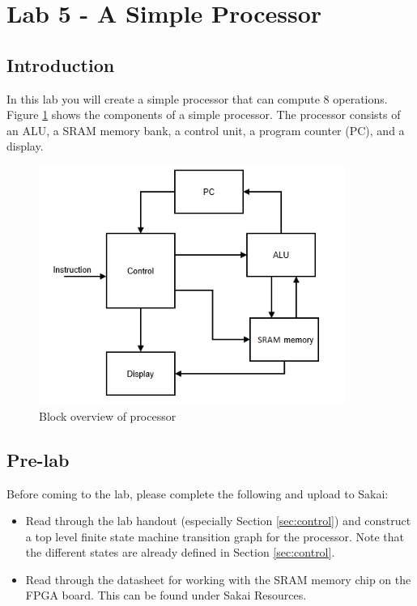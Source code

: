 \section{Lab 5 - A Simple Processor}

\subsection{Introduction}
In this lab you will create a simple processor that can compute 8 operations. Figure \ref{fig:block} shows the components of a simple processor. The processor consists of an ALU, a SRAM memory bank, a control unit, a program counter (PC), and a display.  

\begin{figure}[H]
	\centering
	\includegraphics[width=100mm]{Lab5/figures/block.png}
	\caption{Block overview of processor}
	\label{fig:block}
\end{figure} 

	
\subsection{Pre-lab}

Before coming to the lab, please complete the following and upload to Sakai:
\begin{itemize}
	\item Read through the lab handout (especially Section \ref{sec:control}) and construct a top level finite state machine transition graph for the processor. Note that the different states are already defined in Section \ref{sec:control}.

	\item Read through the datasheet for working with the SRAM memory chip on the FPGA board. This can be found under Sakai Resources.
\end{itemize}

